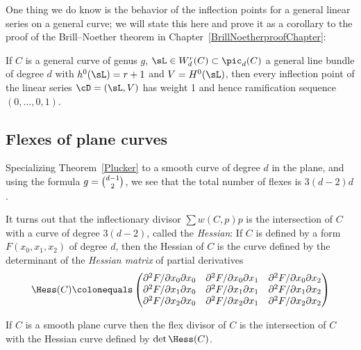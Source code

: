 One thing we do know is the behavior of the inflection points for a
general linear series on a general curve; we will state this here and
prove it as a corollary to the proof of the Brill--Noether theorem in
Chapter~\ref{BrillNoetherproofChapter}:

\begin{theorem}\label{Brill Noether Plucker}
If $C$ is a general curve of genus $g$, $\sL \in W^r_d(C) \subset
\pic_d(C)$ a general line bundle of degree $d$ with $h^0(\sL) = r+1$ and
$V = H^0(\sL)$, then every inflection point of the linear series $\cD =
(\sL, V)$ has weight 1 and hence ramification sequence $(0, \dots, 0, 1)$.
\end{theorem}


\subsection*{Flexes of plane curves}
\label{plane curve pluecker}

Specializing Theorem~\ref{Plucker} to a smooth curve of degree $d$
in the plane, and using the formula
$g= \tbinom{d-1}{2}$, we see that the total number of flexes is $3(d-2)d$.

It turns out that the 
inflectionary divisor
%
$\sum w(C, p)p$
is the intersection of $C$ with a curve of degree $3(d-2)$, called the
%
%
\emph{Hessian}: If $C$ is defined by a form $F(x_0, x_1, x_2)$ of degree
$d$, then
the Hessian of $C$ is the curve defined by the determinant of the
\emph{Hessian matrix} of partial derivatives
$$
\Hess(C) \colonequals
\begin{pmatrix}
 \partial^2 F/\partial x_0 \partial x_0 & \partial^2 F/\partial x_0
 \partial x_1 & \partial^2 F/\partial x_0 \partial x_2 \\
\partial^2 F/\partial x_1 \partial x_0 & \partial^2 F/\partial x_1
\partial x_1 & \partial^2 F/\partial x_1 \partial x_2 \\
\partial^2 F/\partial x_2 \partial x_0 & \partial^2 F/\partial x_2
\partial x_1 & \partial^2 F/\partial x_2 \partial x_2
\end{pmatrix}
$$

\begin{theorem}\label{Hessian} If $C$ is a smooth plane curve then the
%
flex divisor of $C$ is the intersection
of $C$ with the Hessian curve defined by $\det \Hess(C)$.
\unif
\end{theorem}


